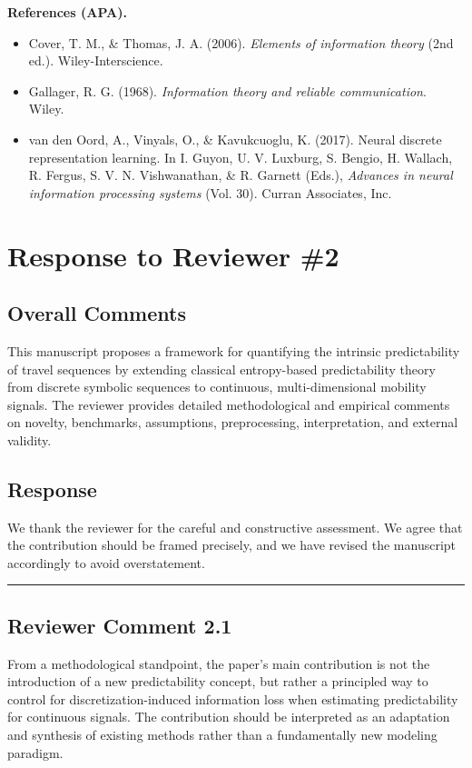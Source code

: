\documentclass{NSF}
\begin{document}
\vskip 0.05in
\noindent\textbf{References (APA).}
\begin{itemize}
    \item Cover, T. M., \& Thomas, J. A. (2006). \textit{Elements of information theory} (2nd ed.). Wiley-Interscience.
    \item Gallager, R. G. (1968). \textit{Information theory and reliable communication}. Wiley.
    \item van den Oord, A., Vinyals, O., \& Kavukcuoglu, K. (2017). Neural discrete representation learning. In I. Guyon, U. V. Luxburg, S. Bengio, H. Wallach, R. Fergus, S. V. N. Vishwanathan, \& R. Garnett (Eds.), \textit{Advances in neural information processing systems} (Vol. 30). Curran Associates, Inc.
\end{itemize}

\newpage
\section{Response to Reviewer \#2}
\subsection*{Overall Comments}
\begin{mdframed}
This manuscript proposes a framework for quantifying the intrinsic predictability of travel sequences by extending classical entropy-based predictability theory from discrete symbolic sequences to continuous, multi-dimensional mobility signals. The reviewer provides detailed methodological and empirical comments on novelty, benchmarks, assumptions, preprocessing, interpretation, and external validity.
\end{mdframed}
\subsection{Response}
We thank the reviewer for the careful and constructive assessment. We agree that the contribution should be framed precisely, and we have revised the manuscript accordingly to avoid overstatement.

\noindent\rule{16.5cm}{1.0pt}

\subsection{Reviewer Comment 2.1}
\begin{mdframed}
From a methodological standpoint, the paper's main contribution is not the introduction of a new predictability concept, but rather a principled way to control for discretization-induced information loss when estimating predictability for continuous signals. The contribution should be interpreted as an adaptation and synthesis of existing methods rather than a fundamentally new modeling paradigm.
\end{mdframed}
\end{document}
